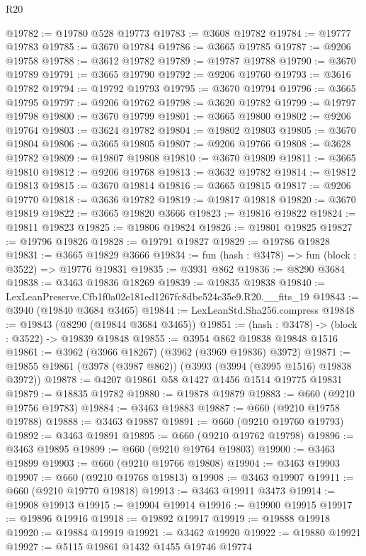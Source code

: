\begin{lexlean}{R20}
\begin{coremodule}
@19782 := @19780 @528 @19773
@19783 := @3608 @19782
@19784 := @19777 @19783
@19785 := @3670 @19784
@19786 := @3665 @19785
@19787 := @9206 @19758
@19788 := @3612 @19782
@19789 := @19787 @19788
@19790 := @3670 @19789
@19791 := @3665 @19790
@19792 := @9206 @19760
@19793 := @3616 @19782
@19794 := @19792 @19793
@19795 := @3670 @19794
@19796 := @3665 @19795
@19797 := @9206 @19762
@19798 := @3620 @19782
@19799 := @19797 @19798
@19800 := @3670 @19799
@19801 := @3665 @19800
@19802 := @9206 @19764
@19803 := @3624 @19782
@19804 := @19802 @19803
@19805 := @3670 @19804
@19806 := @3665 @19805
@19807 := @9206 @19766
@19808 := @3628 @19782
@19809 := @19807 @19808
@19810 := @3670 @19809
@19811 := @3665 @19810
@19812 := @9206 @19768
@19813 := @3632 @19782
@19814 := @19812 @19813
@19815 := @3670 @19814
@19816 := @3665 @19815
@19817 := @9206 @19770
@19818 := @3636 @19782
@19819 := @19817 @19818
@19820 := @3670 @19819
@19822 := @3665 @19820 @3666
@19823 := @19816 @19822
@19824 := @19811 @19823
@19825 := @19806 @19824
@19826 := @19801 @19825
@19827 := @19796 @19826
@19828 := @19791 @19827
@19829 := @19786 @19828
@19831 := @3665 @19829 @3666
@19834 := fun (hash : @3478) => fun (block : @3522) => @19776 @19831
@19835 := @3931 @862
@19836 := @8290 @3684
@19838 := @3463 @19836 @18269
@19839 := @19835 @19838
@19840 := LexLeanPreserve.Cfb1f0a02e181ed1267fc8dbc524c35e9.R20.__fits_19
@19843 := @3940 (@19840 @3684 @3465)
@19844 := LexLeanStd.Sha256.compress
@19848 := @19843 (@8290 (@19844 @3684 @3465))
@19851 := (hash : @3478) -> (block : @3522) -> @19839 @19848
@19855 := @3954 @862 @19838 @19848 @1516
@19861 := @3962 (@3966 @18267) (@3962 (@3969 @19836) @3972)
@19871 := @19855 @19861 (@3978 (@3987 @862)) (@3993 (@3994 (@3995 @1516) @19838 @3972))
@19878 := @4207 @19861 @58 @1427 @1456 @1514 @19775 @19831
@19879 := @18835 @19782
@19880 := @19878 @19879
@19883 := @660 (@9210 @19756 @19783)
@19884 := @3463 @19883
@19887 := @660 (@9210 @19758 @19788)
@19888 := @3463 @19887
@19891 := @660 (@9210 @19760 @19793)
@19892 := @3463 @19891
@19895 := @660 (@9210 @19762 @19798)
@19896 := @3463 @19895
@19899 := @660 (@9210 @19764 @19803)
@19900 := @3463 @19899
@19903 := @660 (@9210 @19766 @19808)
@19904 := @3463 @19903
@19907 := @660 (@9210 @19768 @19813)
@19908 := @3463 @19907
@19911 := @660 (@9210 @19770 @19818)
@19913 := @3463 @19911 @3473
@19914 := @19908 @19913
@19915 := @19904 @19914
@19916 := @19900 @19915
@19917 := @19896 @19916
@19918 := @19892 @19917
@19919 := @19888 @19918
@19920 := @19884 @19919
@19921 := @3462 @19920
@19922 := @19880 @19921
@19927 := @5115 @19861 @1432 @1455 @19746 @19774

\end{coremodule}
\end{lexlean}
